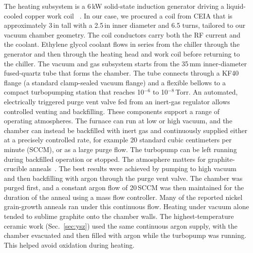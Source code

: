 \documentclass[%
 aip,
 rsi,%
 amsmath,amssymb,
 reprint,%
]{revtex4-2}
\begin{document}
The heating subsystem is a 6\,kW solid-state induction generator driving a
liquid-cooled copper work coil ~\cite{vankan2024electromagneticinductionheating,xu2026designandoptimization}. In our case, we procured a coil from CEIA that is approximately 3\,in tall with a
2.5\,in inner diameter and 6.5
turns, tailored to our vacuum
chamber geometry.
The coil conductors carry both the RF current and the coolant. Ethylene
glycol coolant flows in series from the chiller through the generator and
then through the heating head and work coil before returning to the chiller.
The vacuum and gas subsystem starts from the 35\,mm inner-diameter
fused-quartz tube that forms the chamber. The tube connects through a KF40
flange (a standard clamp-sealed vacuum flange) and a flexible bellows to a
compact turbopumping station that
reaches 10$^{-6}$ to 10$^{-8}$\,Torr. An automated, electrically triggered
purge vent valve fed from an inert-gas regulator allows controlled venting and
backfilling.
These components support a range of operating atmospheres. The furnace can
run at low or high vacuum, and the chamber can instead be backfilled with
inert gas and continuously supplied either at a precisely controlled rate,
for example 20 standard cubic centimeters per minute (SCCM), or as a large
purge flow. The turbopump can be left running during backfilled operation or
stopped.
The atmosphere matters for
graphite-crucible anneals~\cite{kanda2007developmentofhightemperature,inaba1986effectsofthe}.
The best results were
achieved by pumping to high vacuum and then backfilling with argon through
the purge vent valve. The chamber was purged first, and a constant argon flow of
20\,SCCM was then maintained for the
duration of the anneal using a mass flow controller. Many of the reported nickel grain-growth anneals
ran under this continuous flow.
Heating under vacuum alone tended to sublime graphite onto the chamber
walls. The highest-temperature ceramic work (Sec.~\ref{sec:ysz}) used the
same continuous argon supply, with the chamber evacuated and then filled
with argon while the turbopump was running. This helped avoid oxidation
during heating.
\end{document}

